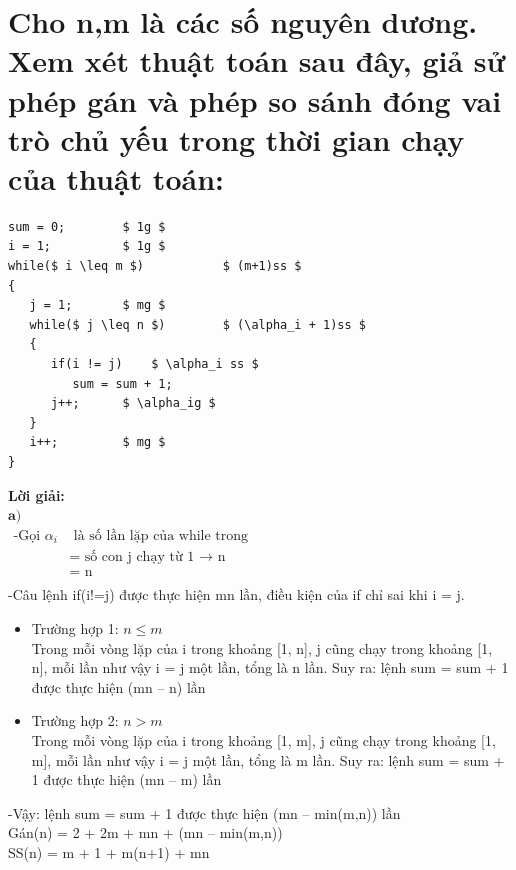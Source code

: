 \documentclass[12pt, letterpaper]{article}
\begin{document}
\section{Cho n,m là các số nguyên dương. Xem xét thuật toán sau đây, giả sử phép gán và phép so sánh đóng vai trò chủ yếu trong thời gian chạy của thuật toán:}

\begin{lstlisting}
sum = 0;		$ 1g $
i = 1;			$ 1g $
while($ i \leq m $)		      $ (m+1)ss $
{
   j = 1;		$ mg $
   while($ j \leq n $)	      $ (\alpha_i + 1)ss $
   {
      if(i != j)	$ \alpha_i ss $
         sum = sum + 1;
      j++;		$ \alpha_ig $
   }
   i++;			$ mg $
}
\end{lstlisting}
\textbf{Lời giải:} \\
$\textbf{a)}$ \\
$ \begin{aligned}
	\text{-Gọi } \alpha_i & \text{ là số lần lặp của while trong}            \\
	                     & \text{= số con j chạy từ 1 $\rightarrow$ n}      \\
	                     & \text{= n}                                  &  & \\
\end{aligned} $ \\
-Câu lệnh if(i!=j) được thực hiện mn lần, điều kiện của if chỉ sai khi i = j.
\begin{itemize}
	\item Trường hợp 1: $n \leq m$ \\
	      Trong mỗi vòng lặp của i trong khoảng [1, n], j cũng chạy trong khoảng [1, n], mỗi lần như vậy i = j một lần, tổng là n lần.
	      Suy ra: lệnh sum = sum + 1 được thực hiện (mn – n) lần
	\item Trường hợp 2: $n > m$ \\
	      Trong mỗi vòng lặp của i trong khoảng [1, m], j cũng chạy trong khoảng [1, m], mỗi lần như vậy i = j một lần, tổng là m lần.
	      Suy ra: lệnh sum = sum + 1 được thực hiện (mn – m) lần
\end{itemize}
-Vậy: lệnh sum = sum + 1 được thực hiện (mn – min(m,n)) lần \\
\setlength{\baselineskip}{1.2\baselineskip}
Gán(n) = 2 + 2m + mn + (mn – min(m,n)) \\
SS(n) = m + 1 + m(n+1) + mn \\
\end{document}
